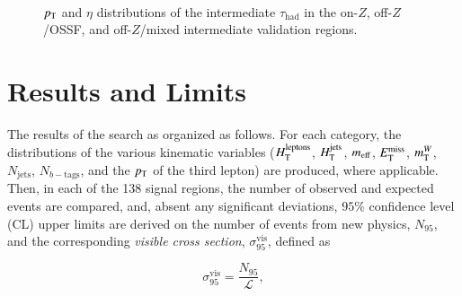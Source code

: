 \begin{figure}[tbp]
  \hfill
   \\
  \caption{$p_{\text{T}}$ and $\eta$ distributions of the intermediate $\tau_{\mathrm{had}}$ in the on-$Z$, off-$Z$/OSSF, and off-$Z$/mixed intermediate validation regions. }
  \label{fig:model-independent-VR-intermediate-tau}
\end{figure}


\section{Results and Limits}\label{sec:model-independent-results}
The results of the search as organized as follows. For each category, the distributions of the various kinematic variables ($H_{\mathrm{T}}^{\mathrm{leptons}}$, $H_{\mathrm{T}}^{\mathrm{jets}}$, $m_{\mathrm{eff}}$, $E_{\text{T}}^{\text{miss}}$, $m_{\mathrm{T}}^W$, $N_{\mathrm{jets}}$, $N_{b-\mathrm{tags}}$, and the $p_{\text{T}}$ of the third lepton) are produced, where applicable. Then, in each of the 138 signal regions, the number of observed and expected events are compared, and, absent any significant deviations, $95\%$ confidence level (CL) upper limits are derived on the number of events from new physics, $N_{95}$, and the corresponding \emph{visible cross section}, $\sigma_{95}^{\mathrm{vis}}$, defined as

\begin{equation}
	\sigma_{95}^{\mathrm{vis}} = \frac{N_{95}}{\mathcal{L}},
\end{equation}

